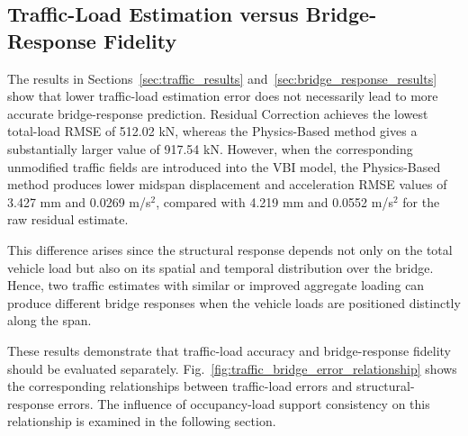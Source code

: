 \documentclass[journal]{IEEEtran}
\begin{document}
\subsection{Traffic-Load Estimation versus Bridge-Response Fidelity}
\label{sec:load_response_fidelity}

The results in Sections~\ref{sec:traffic_results} and~\ref{sec:bridge_response_results} show that lower traffic-load estimation error does not necessarily
lead to more accurate bridge-response prediction. Residual Correction achieves
the lowest total-load RMSE of 512.02 kN, whereas the Physics-Based method gives
a substantially larger value of 917.54 kN. However, when the corresponding
unmodified traffic fields are introduced into the VBI model, the Physics-Based
method produces lower midspan displacement and acceleration RMSE values of
3.427 mm and 0.0269 m/s$^2$, compared with 4.219 mm and 0.0552 m/s$^2$ for the raw
residual estimate.

This difference arises since
the structural response depends not only on the total vehicle load but also on
its spatial and temporal distribution over the bridge. Hence, two traffic
estimates with similar or improved aggregate loading can produce different
bridge responses when the vehicle loads are positioned distinctly along the
span.

These results demonstrate that traffic-load accuracy and bridge-response fidelity should be evaluated separately. Fig.~\ref{fig:traffic_bridge_error_relationship} shows the corresponding relationships between traffic-load errors and structural-response errors. The influence of occupancy-load support consistency on this
relationship is examined in the following section.
\end{document}
